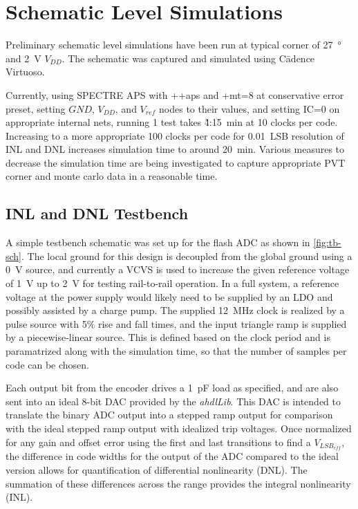 \documentclass[11pt,letterpaper]{article}
\begin{document}
\section{Schematic Level Simulations}

Preliminary schematic level simulations have been run at typical corner of \qty{27}{\degree\C} and \qty{2}{\V} \(V_{DD}\). The schematic was captured and simulated using C\=adence Virtuoso. 

Currently, using SPECTRE APS with ++aps and +mt=8 at conservative error preset, setting \(GND\), \(V_{DD}\), and \(V_{ref}\) nodes to their values, and setting IC=0 on appropriate internal nets, running 1 test takes \~4:\qty{15}{min} at 10 clocks per code. Increasing to a more appropriate 100 clocks per code for \qty{0.01}{LSB} resolution of INL and DNL increases simulation time to around \qty{20}{min}. Various measures to decrease the simulation time are being investigated to capture appropriate PVT corner and monte carlo data in a reasonable time.

\subsection{INL and DNL Testbench}

A simple testbench schematic was set up for the flash ADC as shown in \cref{fig:tb-sch}. The local ground for this design is decoupled from the global ground using a \qty{0}{\V} source, and currently a VCVS is used to increase the given reference voltage of \qty{1}{\V} up to \qty{2}{\V} for testing rail-to-rail operation. In a full system, a reference voltage at the power supply would likely need to be supplied by an LDO and possibly assisted by a charge pump. The supplied \qty{12}{\MHz} clock is realized by a pulse source with 5\% rise and fall times, and the input triangle ramp is supplied by a piecewise-linear source. This is defined based on the clock period and is paramatrized along with the simulation time, so that the number of samples per code can be chosen.

Each output bit from the encoder drives a \qty{1}{\pF} load as specified, and are also sent into an ideal 8-bit DAC provided by the \emph{ahdlLib}. This DAC is intended to translate the binary ADC output into a stepped ramp output for comparison with the ideal stepped ramp output with idealized trip voltages. Once normalized for any gain and offset error using the first and last transitions to find a \(V_{LSB_{eff}}\), the difference in code widths for the output of the ADC compared to the ideal version allows for quantification of differential nonlinearity (DNL). The summation of these differences across the range provides the integral nonlinearity (INL).
\end{document}

